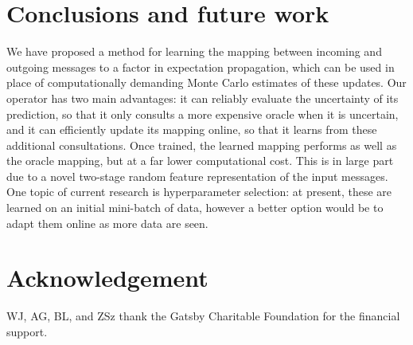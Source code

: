 \documentclass[english]{article}
\theoremstyle{plain}
\theoremstyle{plain}
\begin{document}
\section{Conclusions and future work\label{sec:Conclusions-and-Future} }

We have proposed a method for learning the mapping between incoming and outgoing
messages to a factor in expectation propagation, which can be used
in place of computationally demanding Monte Carlo estimates of these updates.
Our operator has two main advantages: it can reliably evaluate the uncertainty of its prediction,
so that it only consults a more expensive oracle when it is uncertain,
and it can efficiently update its mapping online, so that it learns
from these additional consultations. Once trained, the learned mapping
performs as well as the oracle mapping, but at a far lower computational cost.
This is in large part due to a novel two-stage random feature representation of the input
messages. One topic of current research is hyperparameter selection:
at present, these are learned on an initial mini-batch of data, however
a better option would be to adapt them online as more data are seen.

\section*{Acknowledgement}
WJ, AG, BL, and ZSz thank the Gatsby Charitable Foundation for the financial
support.



\end{document}
